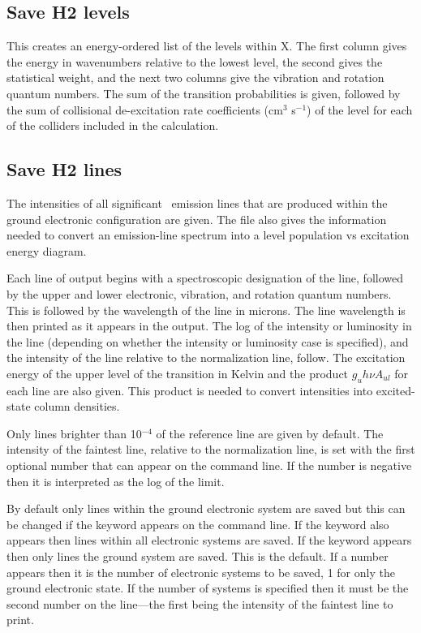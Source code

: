 \subsection{Save H2 levels}

This creates an energy-ordered list of the levels within X.  The first
column gives the energy in wavenumbers relative to the lowest level, the
second gives the statistical weight, and the next two columns give the
vibration and rotation quantum numbers.  The sum of the transition
probabilities is given, followed by the sum of collisional de-excitation rate
coefficients (cm$^{3}$ s$^{-1}$) of the level for each of the colliders 
included in the calculation.

\subsection{Save H2 lines}

The intensities of all significant \htwo\ emission lines that are produced
within the ground electronic configuration are given.  The file also gives the
information needed to convert an emission-line spectrum into a level
population vs excitation energy diagram.

Each line of output begins with a spectroscopic designation of the line,
followed by the upper and lower electronic, vibration, and rotation quantum
numbers.
This is followed by the wavelength of the line in microns.
The
line wavelength is then printed as it appears in the output.
The log of
the intensity or luminosity in the line (depending on whether the intensity
or luminosity case is specified), and the intensity of the line relative
to the normalization line, follow.
The excitation energy of the upper
level of the transition in Kelvin and the product
$g_u h\nu A_{ul} $  for each line are also given.
This product is needed to convert
intensities into excited-state column densities.

Only lines brighter than 10$^{-4}$ of the reference line are given by default.
The intensity of the faintest line, relative to the normalization line,
is set with the first optional number that can appear on the command line.
If the number is negative then it is interpreted as the log of the limit.

By default only lines within the ground electronic system are saved
but this can be changed if the keyword 
appears on the command line.
If the keyword  also appears then lines
within all electronic systems are saved.
If the keyword  appears then only lines the
ground system are saved.  This is the default.  If a number appears then
it is the number of electronic systems to be saved, 1 for only the ground
electronic state.  If the number of systems is specified then it must be
the second number on the line---the first being
the intensity of the faintest line to print.


